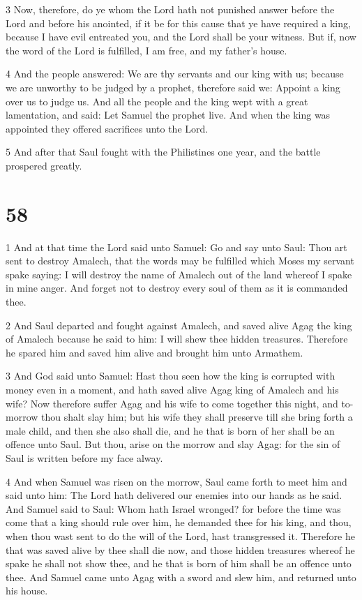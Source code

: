 \par 3 Now, therefore, do ye whom the Lord hath not punished answer before the Lord and before his anointed, if it be for this cause that ye have required a king, because I have evil entreated you, and the Lord shall be your witness. But if, now the word of the Lord is fulfilled, I am free, and my father's house. 

\par 4 And the people answered: We are thy servants and our king with us; because we are unworthy to be judged by a prophet, therefore said we: Appoint a king over us to judge us. And all the people and the king wept with a great lamentation, and said: Let Samuel the prophet live. And when the king was appointed they offered sacrifices unto the Lord.

\par 5 And after that Saul fought with the Philistines one year, and the battle prospered greatly. 

\chapter{58}

\par 1 And at that time the Lord said unto Samuel: Go and say unto Saul: Thou art sent to destroy Amalech, that the words may be fulfilled which Moses my servant spake saying: I will destroy the name of Amalech out of the land whereof I spake in mine anger. And forget not to destroy every soul of them as it is commanded thee. 

\par 2 And Saul departed and fought against Amalech, and saved alive Agag the king of Amalech because he said to him: I will shew thee hidden treasures. Therefore he spared him and saved him alive and brought him unto Armathem. 

\par 3 And God said unto Samuel: Hast thou seen how the king is corrupted with money even in a moment, and hath saved alive Agag king of Amalech and his wife? Now therefore suffer Agag and his wife to come together this night, and to-morrow thou shalt slay him; but his wife they shall preserve till she bring forth a male child, and then she also shall die, and he that is born of her shall be an offence unto Saul. But thou, arise on the morrow and slay Agag: for the sin of Saul is written before my face alway.

\par 4 And when Samuel was risen on the morrow, Saul came forth to meet him and said unto him: The Lord hath delivered our enemies into our hands as he said. And Samuel said to Saul: Whom hath Israel wronged? for before the time was come that a king should rule over him, he demanded thee for his king, and thou, when thou wast sent to do the will of the Lord, hast transgressed it. Therefore he that was saved alive by thee shall die now, and those hidden treasures whereof he spake he shall not show thee, and he that is born of him shall be an offence unto thee. And Samuel came unto Agag with a sword and slew him, and returned unto his house.

